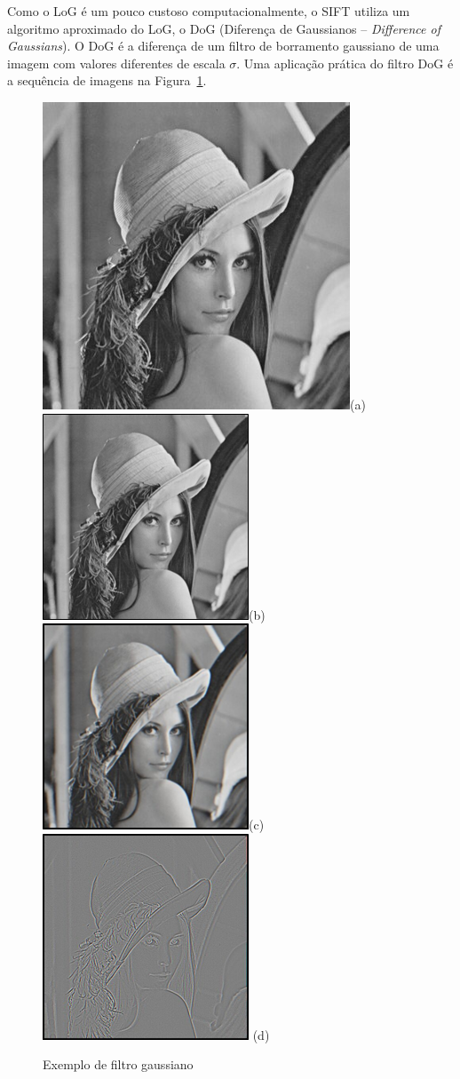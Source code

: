 Como o LoG é um pouco custoso computacionalmente, o SIFT utiliza um
algoritmo aproximado do LoG, o DoG (Diferença de Gaussianos -- \emph{Difference
of Gaussians}). O DoG é a diferença de um filtro de borramento gaussiano de uma imagem com
valores diferentes de escala $\sigma$.
Uma aplicação prática do filtro DoG é a sequência de imagens na
Figura~\ref{fig:lenadog}.

\begin{figure} [!h]
	\centering
	\caption{Exemplo de filtro gaussiano}
	\includegraphics[width=0.20\linewidth]{figs/lena.jpg}(a)
	\includegraphics[width=0.20\linewidth]{figs/lenaSigma1.png}(b)
	\includegraphics[width=0.20\linewidth]{figs/lenaSigma2.png}(c)
 	\includegraphics[width=0.20\linewidth]{figs/lenaDoG.png} (d)
	\label{fig:lenadog}
\end{figure}


